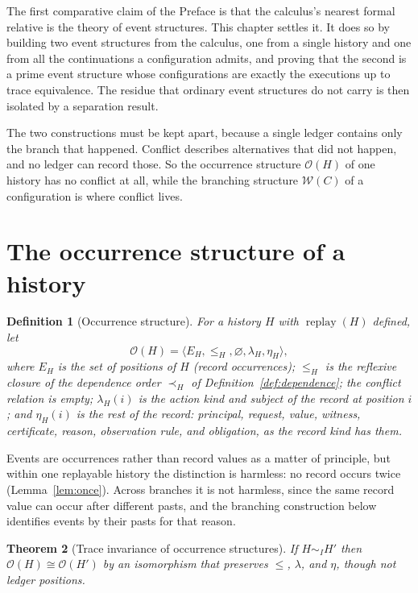 \documentclass[11pt,openany]{book}
\newtheorem{theorem}{Theorem}[chapter]
\newtheorem{definition}[theorem]{Definition}
\theoremstyle{remark}
\newcommand{\replay}{\operatorname{replay}}
\begin{document}
The first comparative claim of the Preface is that the calculus's nearest
formal relative is the theory of event structures. This chapter settles
it. It does so by building two event structures from the calculus, one
from a single history and one from all the continuations a configuration
admits, and proving that the second is a prime event structure whose
configurations are exactly the executions up to trace equivalence. The
residue that ordinary event structures do not carry is then isolated by a
separation result.

The two constructions must be kept apart, because a single ledger contains
only the branch that happened. Conflict describes alternatives that did
not happen, and no ledger can record those. So the occurrence structure
$\mathcal O(H)$ of one history has no conflict at all, while the branching
structure $\mathcal W(C)$ of a configuration is where conflict lives.

\section{The occurrence structure of a history}

\begin{definition}[Occurrence structure]
For a history $H$ with $\replay(H)$ defined, let
\[
\mathcal O(H)=\langle E_H,\le_H,\varnothing,\lambda_H,\eta_H\rangle,
\]
where $E_H$ is the set of positions of $H$ (record occurrences); $\le_H$ is
the reflexive closure of the dependence order $\prec_H$ of
Definition~\ref{def:dependence}; the conflict relation is empty;
$\lambda_H(i)$ is the action kind and subject of the record at position
$i$; and $\eta_H(i)$ is the rest of the record: principal, request, value,
witness, certificate, reason, observation rule, and obligation, as the
record kind has them.
\end{definition}

Events are occurrences rather than record values as a matter of principle,
but within one replayable history the distinction is harmless: no record
occurs twice (Lemma~\ref{lem:once}). Across branches it is not harmless,
since the same record value can occur after different pasts, and the
branching construction below identifies events by their pasts for that
reason.

\begin{theorem}[Trace invariance of occurrence structures]\label{thm:otrace}
If $H\sim_I H'$ then $\mathcal O(H)\cong\mathcal O(H')$ by an isomorphism
that preserves $\le$, $\lambda$, and $\eta$, though not ledger positions.
\end{theorem}
\end{document}
